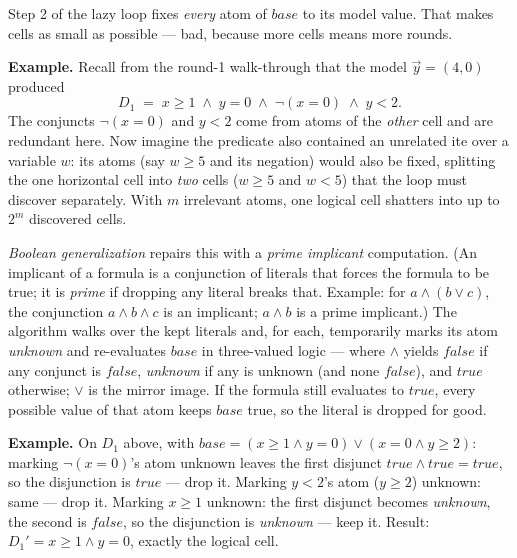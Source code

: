 \documentclass[11pt]{article}
\newcommand{\vy}{\ensuremath{\vec{y}}\xspace}
\newcommand{\true}{\ensuremath{\mathit{true}}\xspace}
\newcommand{\false}{\ensuremath{\mathit{false}}\xspace}
\begin{document}
Step 2 of the lazy loop fixes \emph{every} atom of $\mathit{base}$ to its
model value. That makes cells as small as possible --- bad, because more
cells means more rounds.

\begin{exbox}
\textbf{Example.} Recall from the round-1 walk-through that the model
$\vy = (4,0)$ produced
\[
D_1 \;=\; x \ge 1 \;\wedge\; y = 0 \;\wedge\; \neg(x = 0) \;\wedge\; y < 2 .
\]
The conjuncts $\neg(x = 0)$ and $y < 2$ come from atoms of the
\emph{other} cell and are redundant here. Now imagine the predicate also
contained an unrelated \textsf{ite} over a variable $w$: its atoms (say
$w \ge 5$ and its negation) would also be fixed, splitting the one
horizontal cell into \emph{two} cells ($w \ge 5$ and $w < 5$) that the
loop must discover separately. With $m$ irrelevant atoms, one logical cell
shatters into up to $2^m$ discovered cells.
\end{exbox}

\emph{Boolean generalization} repairs this with a \emph{prime implicant}
computation. (An implicant of a formula is a conjunction of literals that
forces the formula to be true; it is \emph{prime} if dropping any literal
breaks that. Example: for $a \wedge (b \vee c)$, the conjunction
$a \wedge b \wedge c$ is an implicant; $a \wedge b$ is a prime implicant.)
The algorithm walks over the kept literals and, for each, temporarily
marks its atom \emph{unknown} and re-evaluates $\mathit{base}$ in
three-valued logic --- where $\wedge$ yields \false{} if any conjunct is
\false{}, \emph{unknown} if any is unknown (and none \false), and \true{}
otherwise; $\vee$ is the mirror image. If the formula still evaluates to
\true, every possible value of that atom keeps $\mathit{base}$ true, so
the literal is dropped for good.

\begin{exbox}
\textbf{Example.} On
$D_1$ above, with $\mathit{base} = (x{\ge}1 \wedge y{=}0) \vee (x{=}0 \wedge y{\ge}2)$:
marking $\neg(x{=}0)$'s atom unknown leaves the first disjunct
$\true \wedge \true = \true$, so the disjunction is \true{} --- drop it.
Marking $y < 2$'s atom ($y \ge 2$) unknown: same --- drop it. Marking
$x \ge 1$ unknown: the first disjunct becomes \emph{unknown}, the second is
\false, so the disjunction is \emph{unknown} --- keep it. Result:
$D_1' = x \ge 1 \wedge y = 0$, exactly the logical cell.
\end{exbox}
\end{document}
